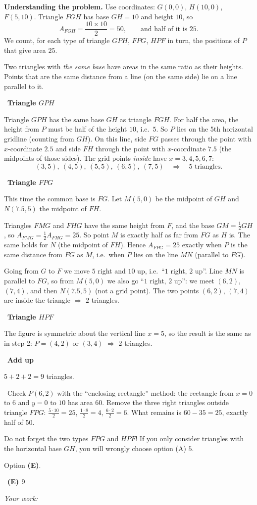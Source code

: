 \documentclass[11pt]{article}
\newif\ifsol \solfalse
\providecommand{\AnsWord}{Đáp số}
\newcommand{\ans}[1]{\par\smallskip{\bfseries\color{tmGreen!88!black}\AnsWord:}\ {\bfseries\color{AnsRed}#1}\par}
\newcommand{\probsol}[1]{%
  \begin{lrbox}{\solmeasure}\begin{minipage}{\dimexpr\linewidth-24pt\relax}#1\end{minipage}\end{lrbox}%
  \ifsol
    \begin{solbox}#1\end{solbox}%
  \else
    \setlength{\solht}{\dimexpr\ht\solmeasure+\dp\solmeasure+0.85cm\relax}%
    \ifdim\solht<1.35cm\setlength{\solht}{1.35cm}\fi
    \ifdim\solht>\StudentMaxWork\setlength{\solht}{\StudentMaxWork}\fi
    \begin{tcolorbox}[colback=white,colframe=Line,boxrule=0.8pt,arc=5pt,
      left=8pt,right=8pt,top=4pt,bottom=4pt,height=\solht]{\footnotesize\color{Slate}\itshape\WorkWord}\end{tcolorbox}%
  \fi}
\newlength{\StudentMaxWork}\setlength{\StudentMaxWork}{7.5cm}
\newcommand{\step}[2]{\par\smallskip\noindent{\bfseries\color{tmBlue!85!black}\StepWord~#1.}\ {\bfseries #2}\par\nopagebreak}
\newcommand{\verify}[1]{\par\smallskip\noindent{\bfseries\color{tmGreen!80!black}\faCheckCircle\ \CheckWord}\ #1\par}
\def\WorkWord{Your work:}
\def\AnsWord{Answer}
\def\StepWord{Step}
\def\CheckWord{Check:}
\begin{document}
\probsol{
\textbf{Understanding the problem.} Use coordinates: $G(0,0)$, $H(10,0)$, $F(5,10)$. Triangle $FGH$ has base
$GH=10$ and height $10$, so
\[ A_{FGH}=\frac{10\times 10}{2}=50,\qquad \text{and half of it is } 25. \]
We count, for each type of triangle $GPH$, $FPG$, $HPF$ in turn, the positions of $P$ that give area $25$.

\begin{recallbox}Two triangles with \emph{the same base} have areas in the same ratio as their heights.
Points that are the same distance from a line (on the same side) lie on a line parallel to it.\end{recallbox}

\step{1}{Triangle $GPH$}
Triangle $GPH$ has the same base $GH$ as triangle $FGH$. For half the area, the height from $P$ must be half of
the height $10$, i.e.\ $5$. So $P$ lies on the 5th horizontal gridline (counting from $GH$).
On this line, side $FG$ passes through the point with $x$-coordinate $2.5$ and side $FH$ through the point with
$x$-coordinate $7.5$ (the midpoints of those sides). The grid points \emph{inside} have $x=3,4,5,6,7$:
\[ (3,5),\ (4,5),\ (5,5),\ (6,5),\ (7,5)\quad\Rightarrow\quad 5 \text{ triangles.} \]

\step{2}{Triangle $FPG$}
This time the common base is $FG$. Let $M(5,0)$ be the midpoint of $GH$ and $N(7.5,5)$ the midpoint of $FH$.
\begin{proofbox}Triangles $FMG$ and $FHG$ have the same height from $F$, and the base $GM=\tfrac12 GH$, so
$A_{FMG}=\tfrac12 A_{FHG}=25$. So point $M$ is exactly half as far from $FG$ as $H$ is. The same holds for $N$
(the midpoint of $FH$). Hence $A_{FPG}=25$ exactly when $P$ is the same distance from $FG$ as $M$, i.e.\ when $P$
lies on the line $MN$ (parallel to $FG$).\end{proofbox}
Going from $G$ to $F$ we move $5$ right and $10$ up, i.e.\ ``$1$ right, $2$ up''. Line $MN$ is parallel to $FG$,
so from $M(5,0)$ we also go ``$1$ right, $2$ up'': we meet $(6,2)$, $(7,4)$, and then $N(7.5,5)$ (not a grid
point). The two points $(6,2)$, $(7,4)$ are inside the triangle $\Rightarrow$ $2$ triangles.

\step{3}{Triangle $HPF$}
The figure is symmetric about the vertical line $x=5$, so the result is the same as in step 2: $P=(4,2)$ or
$(3,4)$ $\Rightarrow$ $2$ triangles.

\step{4}{Add up}
$5+2+2=9$ triangles.

\verify{Check $P(6,2)$ with the ``enclosing rectangle'' method: the rectangle from $x=0$ to $6$ and $y=0$ to $10$
has area $60$. Remove the three right triangles outside triangle $FPG$: $\tfrac{5\cdot 10}{2}=25$,
$\tfrac{1\cdot 8}{2}=4$, $\tfrac{6\cdot 2}{2}=6$. What remains is $60-35=25$, exactly half of $50$.}
\begin{warnbox}Do not forget the two types $FPG$ and $HPF$! If you only consider triangles with the horizontal base
$GH$, you will wrongly choose option (A) $5$.\end{warnbox}
Option \textbf{(E)}.
\ans{(E) $9$}
}
\end{document}
